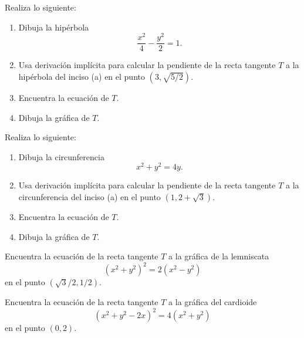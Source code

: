 \documentclass[12pt,a4paper]{book}
\begin{document}
    \begin{ejercicio}\label{ej:262}
        Realiza lo siguiente:
        \begin{enumerate}[nosep]
            \item Dibuja la hipérbola
            \begin{equation*}
                \frac{x^{2}}{4}-\frac{y^{2}}{2}=1.
            \end{equation*}
            \item Usa derivación implícita para calcular la pendiente de la recta tangente $T$
            a la hipérbola del inciso (a) en el punto $(3,\sqrt{5/2})$.
            \item Encuentra la ecuación de $T$.
            \item Dibuja la gráfica de $T$.
        \end{enumerate}
    \end{ejercicio}

    \begin{ejercicio}\label{ej:263}
        Realiza lo siguiente:
        \begin{enumerate}[nosep]
            \item Dibuja la circunferencia
            \begin{equation*}
                x^{2}+y^{2}=4y.
            \end{equation*}
            \item Usa derivación implícita para calcular la pendiente de la recta tangente $T$
            a la circunferencia del inciso (a) en el punto $(1,2+\sqrt{3})$.
            \item Encuentra la ecuación de $T$.
            \item Dibuja la gráfica de $T$.
        \end{enumerate}
    \end{ejercicio}

    \begin{ejercicio}\label{ej:264}
        Encuentra la ecuación de la recta tangente $T$ a la gráfica de
        la lemniscata
        \begin{equation*}
            \left(x^{2}+y^{2}\right)^{2}=2\left(x^{2}-y^{2}\right)
        \end{equation*}
        en el punto $\left(\sqrt{3}/2,1/2\right)$.
    \end{ejercicio}

    \begin{ejercicio}\label{ej:265}
        Encuentra la ecuación de la recta tangente $T$ a la gráfica del
        cardioide
        \begin{equation*}
            \left(x^{2}+y^{2}-2x\right)^{2}=4\left(x^{2}+y^{2}\right)
        \end{equation*}
        en el punto $(0,2)$.
    \end{ejercicio}
\end{document}
